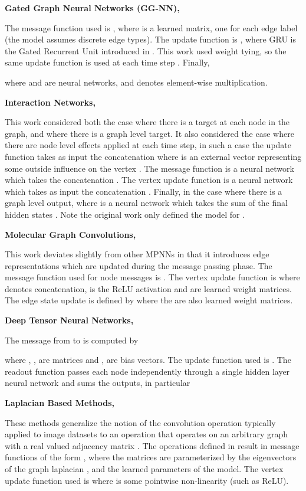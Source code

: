 \documentclass{article}
\begin{document}
\textbf{Gated Graph Neural Networks (GG-NN), \citet{yujia}}

The message function used is , where  is a learned matrix, one for each edge label  (the model assumes discrete edge types). The update function is , where GRU is the Gated Recurrent Unit introduced in \citet{cho2014properties}. This work used weight tying, so the same update function is used at each time step . Finally, 

  where  and  are neural networks, and  denotes element-wise multiplication. 

\textbf{Interaction Networks, \citet{battaglia2016interaction}}

  This work considered both the case where there is a target at each node in the graph, and where there is a graph level target. It also considered the case where there are node level effects applied at each time step, in such a case the update function takes as input the concatenation  where  is an external vector representing some outside influence on the vertex . 
  The message function  is a neural network which takes the concatenation . The vertex update function  is a neural network which takes as input the concatenation . Finally, in the case where there is a graph level output,   where  is a neural network which takes the sum of the final hidden states . Note the original work only defined the model for .

\textbf{Molecular Graph Convolutions, \citet{kearnes2016molecular}}

This work deviates slightly from other MPNNs in that it introduces edge representations  which are updated during the message passing phase. The message function used for node messages is . The vertex update function is  where  denotes concatenation,  is the ReLU activation and  are learned weight matrices.  The edge state update is defined by  where the  are also learned weight matrices. 

\textbf{Deep Tensor Neural Networks, \citet{schutt2017quantum}}

    The message from  to  is computed by
    
    where , ,  are matrices and ,  are bias vectors. The update function used is . The readout function passes each node independently through a single hidden layer neural network and sums the outputs, in particular
    

\textbf{Laplacian Based Methods, \citet{bruna2013spectral,defferrard2016convolutional,kipf2016}}

    These methods generalize the notion of the convolution operation typically applied to image datasets to an operation that operates on an arbitrary graph  with a real valued adjacency matrix . The operations defined in \citet{bruna2013spectral,defferrard2016convolutional} result in message functions of the form , where the matrices  are parameterized by the eigenvectors of the graph laplacian , and the learned parameters of the model. The vertex update function used is  where  is some pointwise non-linearity (such as ReLU).
    
\end{document}
